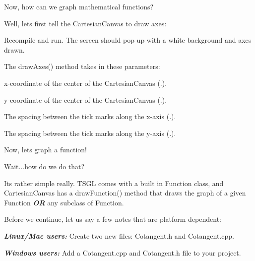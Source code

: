 Now, how can we graph mathematical functions?

Well, let\textquotesingle{}s first tell the Cartesian\+Canvas to draw axes\+:


\begin{DoxyCode}{0}
\DoxyCodeLine{\textcolor{preprocessor}{\#include <tsgl.h>}}
\DoxyCodeLine{}
\DoxyCodeLine{\}}
\end{DoxyCode}


Recompile and run. The screen should pop up with a white background and axes drawn.

The {\ttfamily draw\+Axes()} method takes in these parameters\+:
\begin{DoxyItemize}
\item x-\/coordinate of the center of the Cartesian\+Canvas ({.}).
\item y-\/coordinate of the center of the Cartesian\+Canvas ({.}).
\item The spacing between the tick marks along the x-\/axis ({.}).
\item The spacing between the tick marks along the y-\/axis ({.}).
\end{DoxyItemize}

Now, let\textquotesingle{}s graph a function!

Wait...how do we do that?

It\textquotesingle{}s rather simple really. T\+S\+GL comes with a built in {\ttfamily Function} class, and Cartesian\+Canvas has a {\ttfamily draw\+Function()} method that draws the graph of a given {\ttfamily Function} {\itshape {\bfseries{OR}}} any subclass of {\ttfamily Function}.

Before we continue, let us say a few notes that are platform dependent\+:

{\itshape {\bfseries{Linux/\+Mac users\+:}}} Create two new files\+: Cotangent.\+h and Cotangent.\+cpp.

{\itshape {\bfseries{Windows users\+:}}} Add a Cotangent.\+cpp and Cotangent.\+h file to your project.

